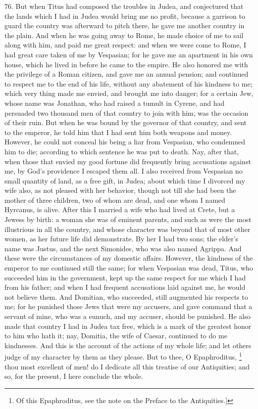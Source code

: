 76. But when Titus had composed the troubles in Judea, and conjectured
that the lands which I had in Judea would bring me no profit, because a
garrison to guard the country was afterward to pitch there, he gave me
another country in the plain. And when he was going away to Rome, he made
choice of me to sail along with him, and paid me great respect: and when
we were come to Rome, I had great care taken of me by Vespasian; for he
gave me an apartment in his own house, which he lived in before he came to
the empire. He also honored me with the privilege of a Roman citizen, and
gave me an annual pension; and continued to respect me to the end of his
life, without any abatement of his kindness to me; which very thing made
me envied, and brought me into danger; for a certain Jew, whose name was
Jonathan, who had raised a tumult in Cyrene, and had persuaded two
thousand men of that country to join with him, was the occasion of their
ruin. But when he was bound by the governor of that country, and sent to
the emperor, he told him that I had sent him both weapons and money.
However, he could not conceal his being a liar from Vespasian, who
condemned him to die; according to which sentence he was put to death.
Nay, after that, when those that envied my good fortune did frequently
bring accusations against me, by God's providence I escaped them all. I
also received from Vespasian no small quantity of land, as a free gift, in
Judea; about which time I divorced my wife also, as not pleased with her
behavior, though not till she had been the mother of three children, two
of whom are dead, and one whom I named Hyrcanus, is alive. After this I
married a wife who had lived at Crete, but a Jewess by birth: a woman she
was of eminent parents, and such as were the most illustrious in all the
country, and whose character was beyond that of most other women, as her
future life did demonstrate. By her I had two sons; the elder's name was
Justus, and the next Simonides, who was also named Agrippa. And these were
the circumstances of my domestic affairs. However, the kindness of the
emperor to me continued still the same; for when Vespasian was dead,
Titus, who succeeded him in the government, kept up the same respect for
me which I had from his father; and when I had frequent accusations laid
against me, he would not believe them. And Domitian, who succeeded, still
augmented his respects to me; for he punished those Jews that were my
accusers, and gave command that a servant of mine, who was a eunuch, and
my accuser, should be punished. He also made that country I had in Judea
tax free, which is a mark of the greatest honor to him who hath it; nay,
Domitia, the wife of Caesar, continued to do me kindnesses. And this is
the account of the actions of my whole life; and let others judge of my
character by them as they please. But to thee, O Epaphroditus, \footnote{Of this Epaphroditus, see
the note on the Preface to the Antiquities.]}
thou most excellent of men! do I dedicate all this treatise of our
Antiquities; and so, for the present, I here conclude the whole.

